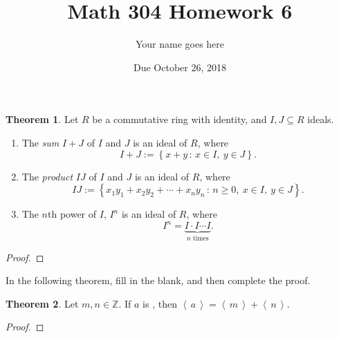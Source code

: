 \documentclass[11pt]{article}		%
\title{Math 304 Homework 6}
\author{Your name goes here}
\date{Due October 26, 2018}
\def\Z{{\mathbb Z}}
\theoremstyle{definition}
\newtheorem{theorem}{Theorem}
\newcommand{\ideal}[1]{\left\langle\, #1 \,\right\rangle}
\def\setof#1#2{{\left\{#1\,\colon\,#2\right\}}}
\begin{document}
\maketitle


\begin{theorem}
	Let $R$ be a commutative ring with identity, and $I,J\subseteq R$ ideals.
	
	\begin{enumerate}
		\item The \emph{sum} $I+J$ of $I$ and $J$ is an ideal of $R$, where
		\[
			I+J := \setof{x+y}{x\in I, \ y\in J}.
		\]
		\item The \emph{product} $IJ$ of $I$ and $J$ is an ideal of $R$, where
		\[
			IJ := \setof{x_1 y_1 + x_2 y_2 + \cdots + x_n y_n}{n\ge 0, \ x\in I, \ y\in J}.
		\]
		\item The $n$th power of $I$, $I^n$ is an ideal of $R$, where
		\[
			I^n = \underbrace{I\cdot I \cdots I}_{n\text{ times}}.
		\]
	\end{enumerate}
\end{theorem}

\begin{proof}

\end{proof}


In the following theorem, fill in the blank, and then complete the proof.

\begin{theorem}
	Let $m,n\in\Z$.
	If $a$ is \makebox[0.75in]{\hrulefill}, then $\ideal{a} = \ideal{m} + \ideal{n}$.
\end{theorem}

\begin{proof}

\end{proof}
 
\end{document}
